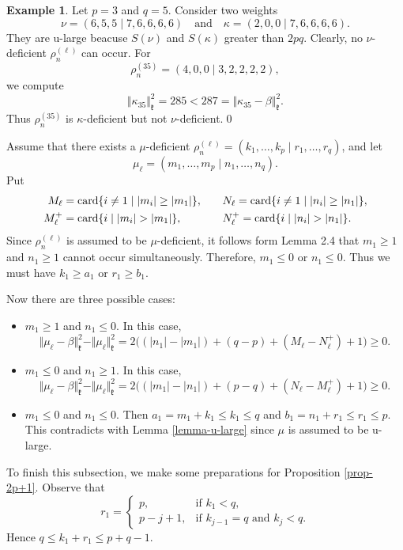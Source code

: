 \documentclass[11pt]{amsart}
\theoremstyle{plain}
\theoremstyle{definition}
\newtheorem{example}[thm]{Example}
\def\card{\mathop{\hbox {card}}\nolimits}
\newcommand{\frk}{\mathfrak{k}}
\begin{document}
\begin{example}\label{example-deficient} Let $p=3$ and $q=5$. Consider two weights
	\[\nu=(6,5,5 \mid 7,6,6,6,6)\quad\mbox{and}\quad \kappa=(2,0,0 \mid 7,6,6,6,6).\]They are u-large beacuse $S(\nu)$ and $S(\kappa)$ greater than $2pq$. Clearly, no $\nu$-deficient $\rho_n^{(\ell)}$ can occur. For
	\[\rho_n^{(35)}=(4,0,0 \mid 3,2,2,2,2),\]
	we compute
\[\Vert\kappa_{35}\Vert_\frk^2=285<287=\Vert\kappa_{35}-\beta\Vert_\frk^2.\]
Thus $\rho_n^{(35)}$ is $\kappa$-deficient but not $\nu$-deficient.\hfill\qed
\end{example}

Assume that there exists a $\mu$-deficient $\rho_n^{(\ell)}=(k_1,\dots,k_p\mid r_1,\dots,r_q)$, and let \[\mu_\ell=(m_1, \dots, m_p \mid n_1, \dots, n_q).\]
Put
\begin{align*}
	M_\ell&=\card\{i\neq 1\mid |m_i|\ge|m_1|\},\quad &&N_\ell=\card\{i\neq 1\mid |n_i|\ge|n_1|\}, \\
	M_\ell^+&=\card\{i\mid |m_i|>|m_1|\},\quad &&N_\ell^+=\card\{i\mid |n_i|>|n_1|\}.
\end{align*}
Since $\rho_n^{(\ell)}$ is assumed to be $\mu$-deficient, it follows form Lemma 2.4 that $m_1\ge 1$ and $n_1\ge 1$ cannot occur simultaneously. Therefore, $m_1\leq 0$ or $n_1\leq 0$.  Thus we must have $k_1\ge a_1$ or $r_1\geq b_1$.

Now there are  three possible cases:
\begin{itemize}
\item[$\bullet$] $m_1\ge 1$ and $n_1\le 0$. In this case,
\begin{equation}\label{eq6}
\Vert\mu_\ell-\beta\Vert_\frk^2-\Vert\mu_\ell\Vert_\frk^2=2\big((|n_1|-|m_1|)+(q-p)+(M_\ell-N_\ell^+)+1\big)\ge 0.
\end{equation}

\item[$\bullet$] $m_1\le 0$ and $n_1\ge 1$. In this case,
\begin{equation}\label{eq7}
\Vert\mu_\ell-\beta\Vert_\frk^2-\Vert\mu_\ell\Vert_\frk^2=2\big((|m_1|-|n_1|)+(p-q)+(N_\ell-M_\ell^+)+1\big)\ge 0.
\end{equation}

\item[$\bullet$] $m_1\le 0$ and $n_1\le 0$.  Then $a_1=m_1+k_1\leq k_1\leq q$ and $b_1=n_1+r_1\leq r_1\leq p$. This contradicts with Lemma \ref{lemma-u-large} since $\mu$ is assumed to be u-large.
\end{itemize}

To finish this subsection, we make some preparations for Proposition \ref{prop-2p+1}. Observe that
\[r_1=\left\{
\begin{array}{lc}
	p, & \mbox{if } k_1<q, \\
	p-j+1, &\mbox{if } k_{j-1}=q \mbox{ and } k_j<q.
\end{array}\right.\]
Hence $q\le k_1+r_1\le p+q-1$.
\end{document}
